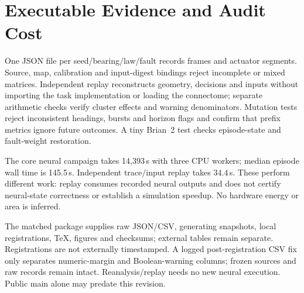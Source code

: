 \section{Executable Evidence and Audit Cost}
One JSON file per seed/bearing/law/fault records frames and actuator segments. Source, map, calibration and input-digest bindings reject incomplete or mixed matrices. Independent replay reconstructs geometry, decisions and inputs without importing the task implementation or loading the connectome; separate arithmetic checks verify cluster effects and warning denominators. Mutation tests reject inconsistent headings, bursts and horizon flags and confirm that prefix metrics ignore future outcomes. A tiny Brian~2 test checks episode-state and fault-weight restoration.

The core neural campaign takes 14,393\,s with three CPU workers; median episode wall time is 145.5\,s. Independent trace/input replay takes 34.4\,s. These perform different work: replay consumes recorded neural outputs and does not certify neural-state correctness or establish a simulation speedup. No hardware energy or area is inferred.

The matched package supplies raw JSON/CSV, generating snapshots, local registrations, TeX, figures and checksums; external tables remain separate. Registrations are not externally timestamped. A logged post-registration CSV fix only separates numeric-margin and Boolean-warning columns; frozen sources and raw records remain intact. Reanalysis/replay needs no new neural execution. Public main alone may predate this revision.
